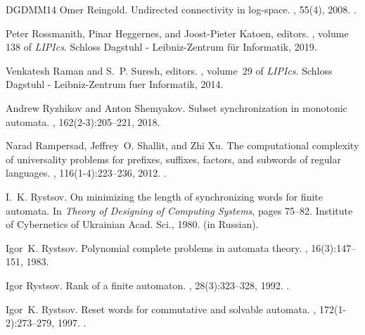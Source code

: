 \documentclass[11pt,a4paper]{amsart}
\theoremstyle{plain}
\theoremstyle{definition}
\theoremstyle{defC}
\theoremstyle{thmC}
\theoremstyle{plain}
\numberwithin{equation}{section}
\begin{document}
\begin{thebibliography}{DGDMM14}
Omer Reingold.
\newblock Undirected connectivity in log-space.
, 55(4), 2008.
\newblock \href {https://doi.org/10.1145/1391289.1391291}
  {}.

Peter Rossmanith, Pinar Heggernes, and Joost{-}Pieter Katoen, editors.
, volume
  138 of {\em LIPIcs}. Schloss Dagstuhl - Leibniz-Zentrum f{\"{u}}r Informatik,
  2019.

Venkatesh Raman and S.~P. Suresh, editors.
, volume~29 of {\em LIPIcs}. Schloss Dagstuhl -
  Leibniz-Zentrum fuer Informatik, 2014.

Andrew Ryzhikov and Anton Shemyakov.
\newblock Subset synchronization in monotonic automata.
, 162(2-3):205--221, 2018.

Narad Rampersad, Jeffrey~O. Shallit, and Zhi Xu.
\newblock The computational complexity of universality problems for prefixes,
  suffixes, factors, and subwords of regular languages.
, 116(1-4):223--236, 2012.
\newblock \href {https://doi.org/10.3233/FI-2012-680}
  {}.

I.~K. Rystsov.
\newblock On minimizing the length of synchronizing words for finite automata.
\newblock In {\em Theory of {D}esigning of {C}omputing {S}ystems}, pages
  75--82. Institute of Cybernetics of Ukrainian Acad. Sci., 1980.
\newblock (in {R}ussian).

Igor~K. Rystsov.
\newblock Polynomial complete problems in automata theory.
, 16(3):147--151, 1983.

Igor Rystsov.
\newblock Rank of a finite automaton.
, 28(3):323--328, 1992.
\newblock \href {https://doi.org/10.1007/BF01125412}
  {}.

Igor~K. Rystsov.
\newblock Reset words for commutative and solvable automata.
, 172(1-2):273--279, 1997.
\newblock \href {https://doi.org/10.1016/S0304-3975(96)00136-3}
  {}.


\end{thebibliography}
\end{document}
